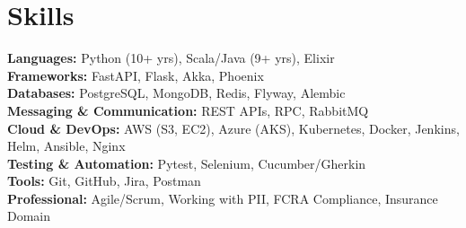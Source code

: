 \documentclass[letterpaper,11pt]{article}
\begin{document}
%
\section{Skills}

 \begin{itemize}[leftmargin=0.15in, label={}]
    \small{\item{
     \textbf{Languages:} Python (10+ yrs), Scala/Java (9+ yrs), Elixir \\
     \textbf{Frameworks:} FastAPI, Flask, Akka, Phoenix \\
     \textbf{Databases:} PostgreSQL, MongoDB, Redis, Flyway, Alembic \\
     \textbf{Messaging \& Communication:} REST APIs, RPC, RabbitMQ \\
     \textbf{Cloud \& DevOps:} AWS (S3, EC2), Azure (AKS), Kubernetes, Docker, Jenkins, Helm, Ansible, Nginx \\
     \textbf{Testing \& Automation:} Pytest, Selenium, Cucumber/Gherkin \\
     \textbf{Tools:} Git, GitHub, Jira, Postman \\
      \textbf{Professional:} Agile/Scrum, Working with PII, FCRA Compliance, Insurance Domain \\
    }}
 \end{itemize}


\end{document}
